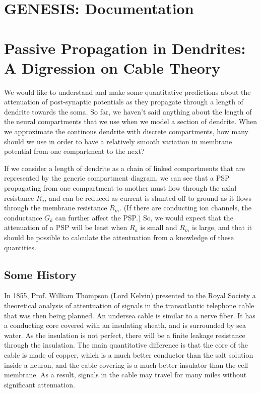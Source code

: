 \documentclass[12pt]{article}
\begin{document}
\section*{GENESIS: Documentation}

\section*{Passive Propagation in Dendrites: A Digression on Cable Theory}

We would like to understand and make some quantitative predictions about the attenuation of post-synaptic potentials as they propagate through a length of dendrite towards the soma. So far, we haven't said anything about the length of the neural compartments that we use when we model a section of dendrite. When we approximate the continous dendrite with discrete compartments, how many should we use in order to have a relatively smooth variation in membrane potential from one compartment to the next?

If we consider a length of dendrite as a chain of linked compartments that are represented by the generic compartment diagram, we can see that a PSP propagating from one compartment to another must flow through the axial resistance $R_a$, and can be reduced as current is shunted off to ground as it flows through the membrane resistance $R_m$. (If there are conducting ion channels, the conductance $G_k$ can further affect the PSP.) So, we would expect that the attenuation of a PSP will be least when $R_a$ is small and $R_m$ is large, and that it should be possible to calculate the attentuation from a knowledge of these quantities.

\subsection*{Some History}

In 1855, Prof. William Thompson (Lord Kelvin) presented to the Royal Society a theoretical analysis of attentuation of signals in the transatlantic telephone cable that was then being planned. An undersea cable is similar to a nerve fiber. It has a conducting core covered with an insulating sheath, and is surrounded by sea water. As the insulation is not perfect, there will be a finite leakage resistance through the insulation. The main quantitative difference is that the core of the cable is made of copper, which is a much better conductor than the salt solution inside a neuron, and the cable covering is a much better insulator than the cell membrane. As a result, signals in the cable may travel for many miles without significant attenuation.
\end{document}
